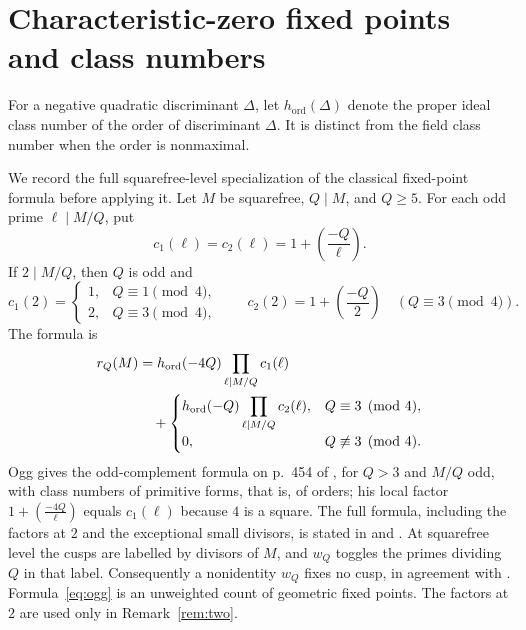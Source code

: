 \documentclass[11pt,a4paper]{article}
\theoremstyle{remark}\newtheorem{remark}[theorem]{Remark}
\numberwithin{equation}{section}
\newcommand{\leg}[2]{\left(\frac{#1}{#2}\right)}
\newcommand{\ho}{h_{\mathrm{ord}}}
\begin{document}
	\section{Characteristic-zero fixed points and class numbers}\label{sec:class}
	For a negative quadratic discriminant $\Delta$, let $\ho(\Delta)$ denote the proper ideal class number of the order of discriminant $\Delta$. It is distinct from the field class number when the order is nonmaximal.
	
	We record the full squarefree-level specialization of the classical fixed-point formula before applying it. Let $M$ be squarefree, $Q\mid M$, and $Q\geq5$. For each odd prime $\ell\mid M/Q$, put
	\[
	c_1(\ell)=c_2(\ell)=1+\leg{-Q}{\ell}.
	\]
	If $2\mid M/Q$, then $Q$ is odd and
	\[
	c_1(2)=\begin{cases}1,&Q\equiv1\pmod4,\\2,&Q\equiv3\pmod4,\end{cases}
	\qquad c_2(2)=1+\leg{-Q}{2}\quad(Q\equiv3\pmod4).
	\]
	The formula is
	\begin{align}
		r_Q(M)&=\ho(-4Q)\prod_{\ell\mid M/Q}c_1(\ell)\notag\\
		&\quad+\begin{cases}
			\ho(-Q)\displaystyle\prod_{\ell\mid M/Q}c_2(\ell),&Q\equiv3\pmod4,\\
			0,&Q\not\equiv3\pmod4.
		\end{cases}\label{eq:ogg}
	\end{align}
	Ogg gives the odd-complement formula on p.~454 of \cite{Ogg}, for $Q>3$ and $M/Q$ odd, with class numbers of primitive forms, that is, of orders; his local factor $1+\leg{-4Q}{\ell}$ equals $c_1(\ell)$ because $4$ is a square. The full formula, including the factors at $2$ and the exceptional small divisors, is stated in \cite[Remark 2, pp.~108--109]{FH} and \cite[Proposition 2.1]{IJK}. At squarefree level the cusps are labelled by divisors of $M$, and $w_Q$ toggles the primes dividing $Q$ in that label. Consequently a nonidentity $w_Q$ fixes no cusp, in agreement with \cite[Proposition 3]{Ogg}. Formula~\eqref{eq:ogg} is an unweighted count of geometric fixed points. The factors at $2$ are used only in Remark~\ref{rem:two}.
	
\end{document}

